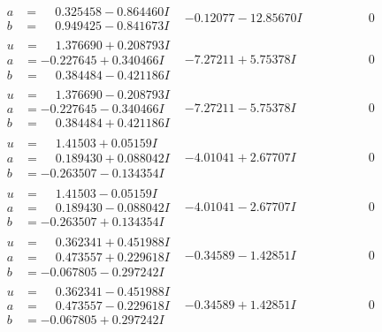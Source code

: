 \documentclass[1p]{elsarticle_modified}
\theoremstyle{definition}
\begin{document}
$$\begin{array}{c|c|c}
\begin{aligned}
a &= \phantom{-}0.325458 - 0.864460 I \\
b &= \phantom{-}0.949425 - 0.841673 I\end{aligned}
 & -0.12077 - 12.85670 I & \phantom{-0.000000 } 0 \\ \hline\begin{aligned}
u &= \phantom{-}1.376690 + 0.208793 I \\
a &= -0.227645 + 0.340466 I \\
b &= \phantom{-}0.384484 - 0.421186 I\end{aligned}
 & -7.27211 + 5.75378 I & \phantom{-0.000000 } 0 \\ \hline\begin{aligned}
u &= \phantom{-}1.376690 - 0.208793 I \\
a &= -0.227645 - 0.340466 I \\
b &= \phantom{-}0.384484 + 0.421186 I\end{aligned}
 & -7.27211 - 5.75378 I & \phantom{-0.000000 } 0 \\ \hline\begin{aligned}
u &= \phantom{-}1.41503 + 0.05159 I \\
a &= \phantom{-}0.189430 + 0.088042 I \\
b &= -0.263507 - 0.134354 I\end{aligned}
 & -4.01041 + 2.67707 I & \phantom{-0.000000 } 0 \\ \hline\begin{aligned}
u &= \phantom{-}1.41503 - 0.05159 I \\
a &= \phantom{-}0.189430 - 0.088042 I \\
b &= -0.263507 + 0.134354 I\end{aligned}
 & -4.01041 - 2.67707 I & \phantom{-0.000000 } 0 \\ \hline\begin{aligned}
u &= \phantom{-}0.362341 + 0.451988 I \\
a &= \phantom{-}0.473557 + 0.229618 I \\
b &= -0.067805 - 0.297242 I\end{aligned}
 & -0.34589 - 1.42851 I & \phantom{-0.000000 } 0 \\ \hline\begin{aligned}
u &= \phantom{-}0.362341 - 0.451988 I \\
a &= \phantom{-}0.473557 - 0.229618 I \\
b &= -0.067805 + 0.297242 I\end{aligned}
 & -0.34589 + 1.42851 I & \phantom{-0.000000 } 0 \\ \hline\begin{aligned}

\end{aligned}
\end{array}$$
\end{document}
